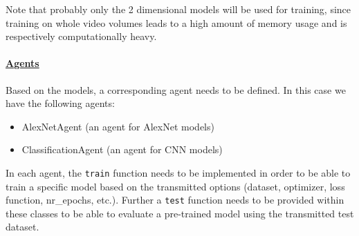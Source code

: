 \documentclass{article}
\begin{document}
\noindent
Note that probably only the 2 dimensional models will be used for training, since training on whole video volumes leads to a high amount of memory usage and is respectively computationally heavy.

\paragraph{\href{https://github.com/amrane99/CAI-Classification/blob/AR/cai/agents/classification_agents.py}{Agents}}
Based on the models, a corresponding agent needs to be defined. In this case we have the following agents:
\begin{itemize}
    \item AlexNetAgent (an agent for AlexNet models)
    \item ClassificationAgent (an agent for CNN models)
\end{itemize}

\noindent
In each agent, the \texttt{train} function needs to be implemented in order to be able to train a specific model based on the transmitted options (dataset, optimizer, loss function, nr\_epochs, etc.). Further a \texttt{test} function needs to be provided within these classes to be able to evaluate a pre-trained model using the transmitted test dataset.
\end{document}
